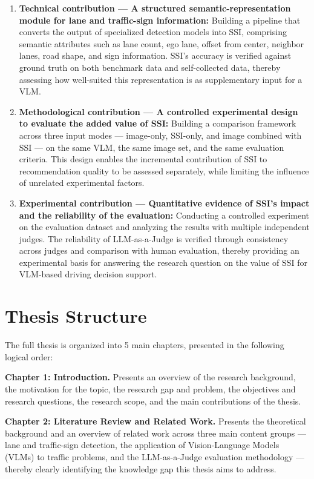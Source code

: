 \documentclass[12pt,a4paper]{report}
\begin{document}
\begin{enumerate}
    \item \textbf{Technical contribution --- A structured semantic-representation module for lane and traffic-sign information:} Building a pipeline that converts the output of specialized detection models into SSI, comprising semantic attributes such as lane count, ego lane, offset from center, neighbor lanes, road shape, and sign information. SSI's accuracy is verified against ground truth on both benchmark data and self-collected data, thereby assessing how well-suited this representation is as supplementary input for a VLM.
    \item \textbf{Methodological contribution --- A controlled experimental design to evaluate the added value of SSI:} Building a comparison framework across three input modes --- image-only, SSI-only, and image combined with SSI --- on the same VLM, the same image set, and the same evaluation criteria. This design enables the incremental contribution of SSI to recommendation quality to be assessed separately, while limiting the influence of unrelated experimental factors.
    \item \textbf{Experimental contribution --- Quantitative evidence of SSI's impact and the reliability of the evaluation:} Conducting a controlled experiment on the evaluation dataset and analyzing the results with multiple independent judges. The reliability of LLM-as-a-Judge is verified through consistency across judges and comparison with human evaluation, thereby providing an experimental basis for answering the research question on the value of SSI for VLM-based driving decision support.
\end{enumerate}

\section{Thesis Structure}

The full thesis is organized into 5 main chapters, presented in the following logical order:

\textbf{Chapter 1: Introduction.} Presents an overview of the research background, the motivation for the topic, the research gap and problem, the objectives and research questions, the research scope, and the main contributions of the thesis.

\textbf{Chapter 2: Literature Review and Related Work.} Presents the theoretical background and an overview of related work across three main content groups --- lane and traffic-sign detection, the application of Vision-Language Models (VLMs) to traffic problems, and the LLM-as-a-Judge evaluation methodology --- thereby clearly identifying the knowledge gap this thesis aims to address.
\end{document}

